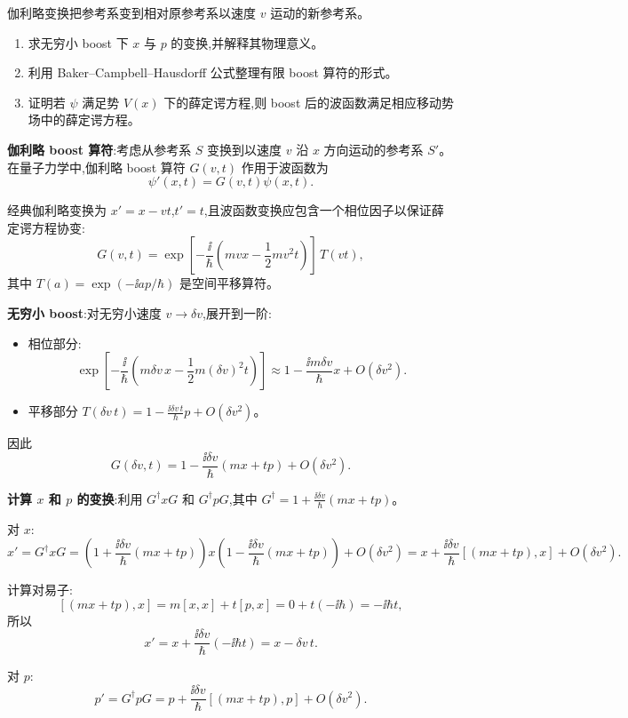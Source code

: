 \begin{question}
伽利略变换把参考系变到相对原参考系以速度 $v$ 运动的新参考系。
\begin{enumerate}
\item 求无穷小 boost 下 $x$ 与 $p$ 的变换,并解释其物理意义。
\item 利用 Baker--Campbell--Hausdorff 公式整理有限 boost 算符的形式。
\item 证明若 $\psi$ 满足势 $V(x)$ 下的薛定谔方程,则 boost 后的波函数满足相应移动势场中的薛定谔方程。
\end{enumerate}
\begin{solution}
	\textbf{伽利略 boost 算符}:考虑从参考系 $S$ 变换到以速度 $v$ 沿 $x$ 方向运动的参考系 $S'$。在量子力学中,伽利略 boost 算符 $G(v,t)$ 作用于波函数为
	\[
	\psi'(x,t) = G(v,t)\psi(x,t).
	\]

	经典伽利略变换为 $x'=x-vt$,$t'=t$,且波函数变换应包含一个相位因子以保证薛定谔方程协变:
	\[
	G(v,t) = \exp\!\left[-\frac{\ii}{\hbar}\left(mvx - \frac12 mv^2 t\right)\right]\,T(vt),
	\]
	其中 $T(a)=\exp(-\ii a p/\hbar)$ 是空间平移算符。

	\textbf{无穷小 boost}:对无穷小速度 $v\to\delta v$,展开到一阶:
	\begin{itemize}
	\item 相位部分:
	\[
	\exp\!\left[-\frac{\ii}{\hbar}\left(m\delta v\,x - \frac12 m(\delta v)^2 t\right)\right]
	\approx 1 - \frac{\ii m\delta v}{\hbar}x + O(\delta v^2).
	\]
	\item 平移部分 $T(\delta v\,t) = 1 - \frac{\ii\delta v\,t}{\hbar}p + O(\delta v^2)$。
	\end{itemize}

	因此
	\[
	G(\delta v,t) = 1 - \frac{\ii\delta v}{\hbar}(mx + tp) + O(\delta v^2).
	\]

	\textbf{计算 $x$ 和 $p$ 的变换}:利用 $G^\dagger x G$ 和 $G^\dagger p G$,其中 $G^\dagger = 1 + \frac{\ii\delta v}{\hbar}(mx+tp)$。

	对 $x$:
	\[
	x' = G^\dagger x G
	= \left(1+\frac{\ii\delta v}{\hbar}(mx+tp)\right) x \left(1-\frac{\ii\delta v}{\hbar}(mx+tp)\right) + O(\delta v^2)
	= x + \frac{\ii\delta v}{\hbar}[(mx+tp),x] + O(\delta v^2).
	\]

	计算对易子:
	\[
	[(mx+tp),x] = m[x,x] + t[p,x] = 0 + t(-\ii\hbar) = -\ii\hbar t,
	\]
	所以
	\[
	x' = x + \frac{\ii\delta v}{\hbar}(-\ii\hbar t) = x - \delta v\,t.
	\]

	对 $p$:
	\[
	p' = G^\dagger p G = p + \frac{\ii\delta v}{\hbar}[(mx+tp),p] + O(\delta v^2).
	\]


\end{solution}
\end{question}
